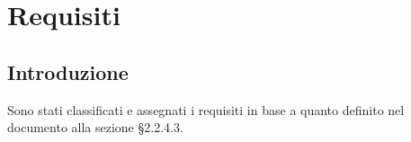\section{Requisiti}

\subsection{Introduzione} 

Sono stati classificati e assegnati i requisiti in base a quanto definito nel documento  alla sezione §2.2.4.3.


\vspace{0.5cm}

\vspace{0.5cm}

\vspace{0.8cm}

